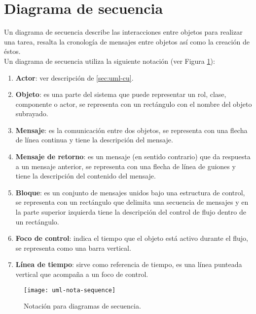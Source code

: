\section{Diagrama de secuencia}\label{sec:uml-seq}
Un diagrama de secuencia describe las interacciones entre objetos para realizar una tarea, resalta la cronología de mensajes entre objetos así como la creación de éstos\cite{UMLClassroom, SoftwareEngineeringUML}.\\
Un diagrama de secuencia utiliza la siguiente notación\cite{UMLClassroom, SoftwareEngineeringUML} (ver Figura \ref{fig:uml-nota-sequence}):
\begin{enumerate}
  \item \textbf{Actor}: ver descripción de \ref{sec:uml-cu}.
  \item \textbf{Objeto}: es una parte del sistema que puede representar un rol, clase, componente o actor, se representa con un rectángulo con el nombre del objeto subrayado.
  \item \textbf{Mensaje}: es la comunicación entre dos objetos, se representa con una flecha de línea continua y tiene la descripción del mensaje.
  \item \textbf{Mensaje de retorno}: es un mensaje (en sentido contrario) que da respuesta a un mensaje anterior, se representa con una flecha de línea de guiones y tiene la descripción del contenido del mensaje.
  \item \textbf{Bloque}: es un conjunto de mensajes unidos bajo una estructura de control, se representa con un rectángulo que delimita una secuencia de mensajes y en la parte superior izquierda tiene la descripción del control de flujo dentro de un rectángulo.
  \item \textbf{Foco de control}: indica el tiempo que el objeto está activo durante el flujo, se representa como una barra vertical.
  \item \textbf{Línea de tiempo}: sirve como referencia de tiempo, es una línea punteada vertical que acompaña a un foco de control.
\end{enumerate}

\begin{figure}[h]
  \centering
  \texttt{[image: uml-nota-sequence]}
  \caption{Notación para diagramas de secuencia\cite{SoftwareEngineeringUML}.}
  \label{fig:uml-nota-sequence}
\end{figure}


